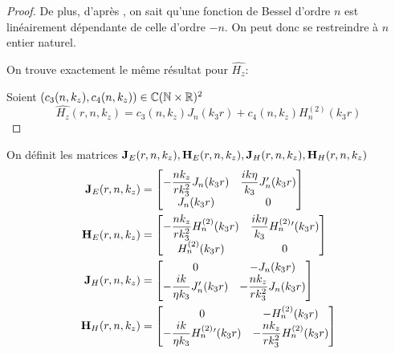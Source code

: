 \begin{proof}
    De plus, d'après \cite[p.~358]{abramowitz_handbook_1964}, on sait qu'une fonction de Bessel d'ordre \(n\) est linéairement dépendante de celle d'ordre \(-n\).
    On peut donc se restreindre à \(n\) entier naturel.

    On trouve exactement le même résultat pour \(\hat{H_z}\): 

    Soient \((c_3(n,k_z),c_4(n,k_z)) \in \mathbb C(\mathbb N\times\mathbb R)^2\)
    \begin{equation}
      \hat{H_z}(r,n,k_z) = c_3(n,k_z) J_n\left(k_3r\right) + c_4(n,k_z) H_n^{(2)}\left(k_3r\right)
    \end{equation}
  \end{proof}


  \begin{defn}
    On définit les matrices \(\mathbf{J}_{E}(r,n,k_z),\mathbf{H}_{E}(r,n,k_z),\mathbf{J}_{H}(r,n,k_z),\mathbf{H}_{H}(r,n,k_z)\)
    \begin{align}
      \mathbf{J}_{E}(r,n,k_z) &=
      \begin{bmatrix}
        -\dfrac{nk_z}{rk_3^2}J_n(k_3r) & \dfrac{ik\eta}{k_3}J_n'(k_3r)
        \\
        J_n(k_3r) & 0
      \end{bmatrix}
      \\
      \mathbf{H}_{E}(r,n,k_z) &=
      \begin{bmatrix}
        -\dfrac{nk_z}{rk_3^2}H_n^{(2)}(k_3r) & \dfrac{ik\eta}{k_3}H_n^{(2)}{}'(k_3r)
        \\
        H_n^{(2)}(k_3r) & 0
      \end{bmatrix}
      \\
      \mathbf{J}_{H}(r,n,k_z) &=
      \begin{bmatrix}
        0 & -J_n(k_3r)
        \\
        -\dfrac{ik}{\eta k_3}J_n'(k_3r) & -\dfrac{nk_z}{rk_3^2}J_n(k_3r)
      \end{bmatrix}
      \\
      \mathbf{H}_{H}(r,n,k_z) &=
      \begin{bmatrix}
        0 & -H_n^{(2)}(k_3r)
        \\
        -\dfrac{ik}{\eta k_3}H_n^{(2)}{}'(k_3r) & -\dfrac{nk_z}{rk_3^2}H_n^{(2)}(k_3r)
      \end{bmatrix}
    \end{align}
  \end{defn}

